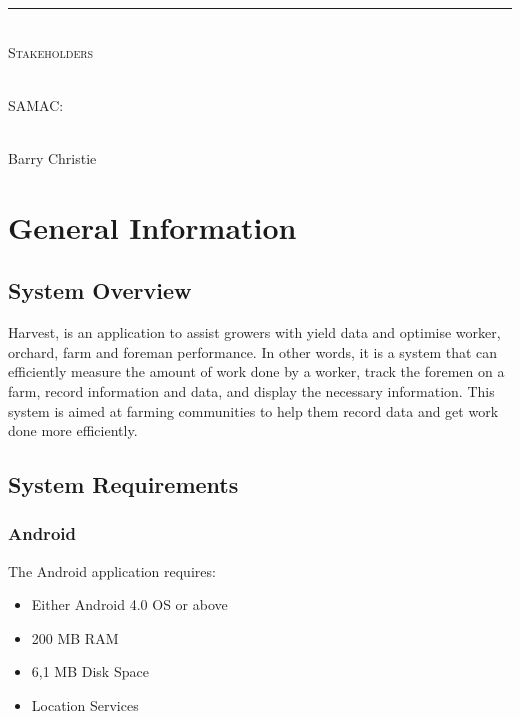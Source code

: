 \documentclass[11pt]{article}
\begin{document}
\begin{titlepage}
\begin{center}
		\vspace{1cm}
		\rule{\linewidth}{0.5mm} \\[1cm]
		\textsc{\Large Stakeholders}\\[1cm]

		\begin{minipage}{0.4\textwidth}
			\begin{flushleft} \large
				\emph{} \\
				SAMAC:
			\end{flushleft}
		\end{minipage}
		\begin{minipage}{0.4\textwidth}
			\begin{flushright} \large
				\emph{} \\
				Barry Christie
			\end{flushright}
		\end{minipage}


	\end{center}
\end{titlepage}

\newpage
{}
\tableofcontents
\newpage
\listoffigures

\newpage
{}

\section{General Information}
\subsection{System Overview}
Harvest, is an application to assist growers with yield data and optimise worker, orchard, farm and foreman performance. In other words, it is a system that can efficiently measure the amount of work done by a worker, track the foremen on a farm, record information and data, and display the necessary information. This system is aimed at farming communities to help them record data and get work done more efficiently.

\subsection{System Requirements}
\subsubsection{Android}
The Android application requires:
\begin{itemize}
 \item Either Android 4.0 OS or above
\item 200 MB RAM
\item 6,1 MB Disk Space
	\item Location Services
\end{itemize}
\end{document}
